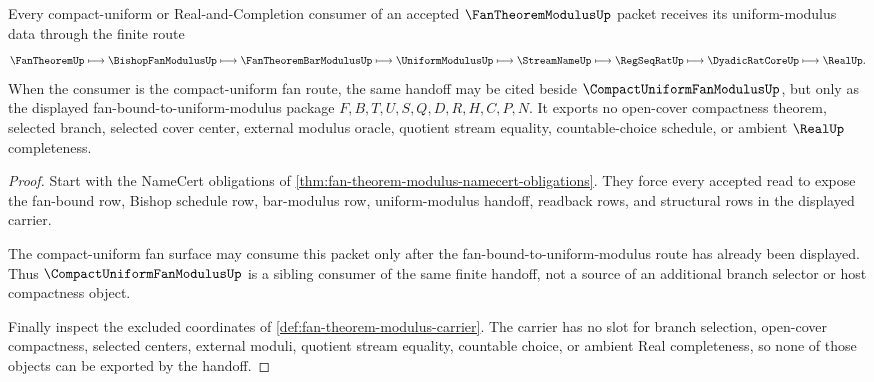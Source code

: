 \begin{theorem}
\label{thm:fan-theorem-modulus-compact-uniform-handoff}
Every compact-uniform or Real-and-Completion consumer of an accepted $\FanTheoremModulusUp$ packet receives its uniform-modulus data through the finite route
$$
\FanTheoremUp
\longmapsto
\BishopFanModulusUp
\longmapsto
\FanTheoremBarModulusUp
\longmapsto
\UniformModulusUp
\longmapsto
\StreamNameUp
\longmapsto
\RegSeqRatUp
\longmapsto
\DyadicRatCoreUp
\longmapsto
\RealUp .
$$
When the consumer is the compact-uniform fan route, the same handoff may be cited beside $\CompactUniformFanModulusUp$, but only as the displayed fan-bound-to-uniform-modulus package $F,B,T,U,S,Q,D,R,H,C,P,N$. It exports no open-cover compactness theorem, selected branch, selected cover center, external modulus oracle, quotient stream equality, countable-choice schedule, or ambient $\RealUp$ completeness.
\end{theorem}
\begin{proof}
Start with the NameCert obligations of \autoref{thm:fan-theorem-modulus-namecert-obligations}. They force every accepted read to expose the fan-bound row, Bishop schedule row, bar-modulus row, uniform-modulus handoff, readback rows, and structural rows in the displayed carrier.

The compact-uniform fan surface may consume this packet only after the fan-bound-to-uniform-modulus route has already been displayed. Thus $\CompactUniformFanModulusUp$ is a sibling consumer of the same finite handoff, not a source of an additional branch selector or host compactness object.

Finally inspect the excluded coordinates of \autoref{def:fan-theorem-modulus-carrier}. The carrier has no slot for branch selection, open-cover compactness, selected centers, external moduli, quotient stream equality, countable choice, or ambient Real completeness, so none of those objects can be exported by the handoff.
\end{proof}


